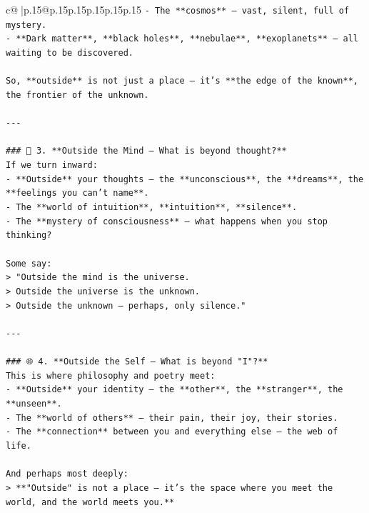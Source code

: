 \documentclass{article}
\begin{document}
{\begin{supertabular}{c@{$\;$}|p{.15\linewidth}@{}p{.15\linewidth}p{.15\linewidth}p{.15\linewidth}p{.15\linewidth}p{.15\linewidth}}
{{{\texttt{{-} The **cosmos** — vast, silent, full of mystery.} \\
\texttt{{-} **Dark matter**, **black holes**, **nebulae**, **exoplanets** — all waiting to be discovered.} \\
\\ 
\texttt{So, **outside** is not just a place — it’s **the edge of the known**, the frontier of the unknown.} \\
\\ 
\texttt{{-}{-}{-}} \\
\\ 
\texttt{\#\#\# 🧠 3. **Outside the Mind — What is beyond thought?**} \\
\texttt{If we turn inward:} \\
\texttt{{-} **Outside** your thoughts — the **unconscious**, the **dreams**, the **feelings you can’t name**.} \\
\texttt{{-} The **world of intuition**, **intuition**, **silence**.} \\
\texttt{{-} The **mystery of consciousness** — what happens when you stop thinking?} \\
\\ 
\texttt{Some say:  } \\
\texttt{> "Outside the mind is the universe.  } \\
\texttt{> Outside the universe is the unknown.  } \\
\texttt{> Outside the unknown — perhaps, only silence."} \\
\\ 
\texttt{{-}{-}{-}} \\
\\ 
\texttt{\#\#\# 🌐 4. **Outside the Self — What is beyond "I"?**} \\
\texttt{This is where philosophy and poetry meet:} \\
\texttt{{-} **Outside** your identity — the **other**, the **stranger**, the **unseen**.} \\
\texttt{{-} The **world of others** — their pain, their joy, their stories.} \\
\texttt{{-} The **connection** between you and everything else — the web of life.} \\
\\ 
\texttt{And perhaps most deeply:} \\
\texttt{> **"Outside" is not a place — it’s the space where you meet the world, and the world meets you.**} \\
\\ 
}}}
\end{supertabular}}
\end{document}
